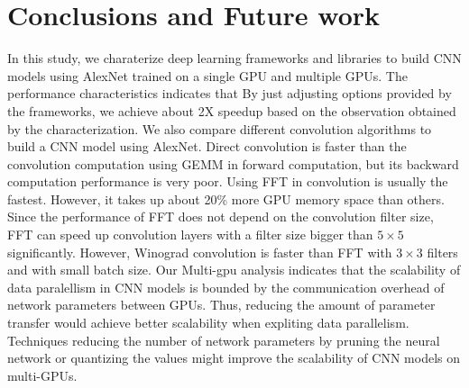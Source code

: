 \section{Conclusions and Future work}
In this study, we charaterize deep learning frameworks and libraries to build CNN models using AlexNet trained on a single GPU and multiple GPUs. The performance characteristics indicates that  By just adjusting options provided by the frameworks, we achieve about 2X speedup based on the observation obtained by the characterization. We also compare different convolution algorithms to build a CNN model using AlexNet. Direct convolution is faster than the convolution computation using GEMM in forward computation, but its backward computation performance is very poor. Using FFT in convolution is usually the fastest. However, it takes up about 20\% more GPU memory space than others. Since the performance of FFT does not depend on the convolution filter size, FFT can speed up convolution layers with a filter size bigger than $5 \times 5$ significantly. However, Winograd convolution is faster than FFT with $3 \times 3$ filters and with small batch size. Our Multi-gpu analysis indicates that the scalability of data paralellism in CNN models is bounded by the communication overhead of network parameters between GPUs. Thus, reducing the amount of parameter transfer would achieve better scalability when expliting data parallelism. Techniques reducing the number of network parameters by pruning the neural network or quantizing the values might improve the scalability of CNN models on multi-GPUs. 
